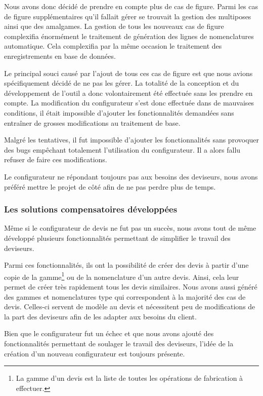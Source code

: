 Nous avons donc décidé de prendre en compte plus de cas de figure.
Parmi les cas de figure supplémentaires qu'il fallait gérer se trouvait la gestion des multiposes ainsi que des amalgames.
La gestion de tous les nouveaux cas de figure complexifia énormément le traitement de génération des lignes de nomenclatures automatique.
Cela complexifia par la même occasion le traitement des enregistrements en base de données.

Le principal souci causé par l'ajout de tous ces cas de figure est que nous avions spécifiquement décidé de ne pas les gérer.
La totalité de la conception et du développement de l'outil a donc volontairement été effectuée sans les prendre en compte.
La modification du configurateur s'est donc effectuée dans de mauvaises conditions, il était impossible d'ajouter les fonctionnalités demandées sans entraîner de grosses modifications au traitement de base.

Malgré les tentatives, il fut impossible d'ajouter les fonctionnalités sans provoquer des bugs empêchant totalement l'utilisation du configurateur.
Il a alors fallu refuser de faire ces modifications.

Le configurateur ne répondant toujours pas aux besoins des deviseurs, nous avons préféré mettre le projet de côté afin de ne pas perdre plus de temps.

\subsubsection{Les solutions compensatoires développées}

Même si le configurateur de devis ne fut pas un succès, nous avons tout de même développé plusieurs fonctionnalités permettant de simplifier le travail des deviseurs.

Parmi ces fonctionnalités, ils ont la possibilité de créer des devis à partir d'une copie de la gamme\footnote{La gamme d'un devis est la liste de toutes les opérations de fabrication à effectuer.} ou de la nomenclature d'un autre devis.
Ainsi, cela leur permet de créer très rapidement tous les devis similaires.
Nous avons aussi généré des gammes et nomenclatures type qui correspondent à la majorité des cas de devis.
Celles-ci servent de modèle au devis et nécessitent peu de modifications de la part des deviseurs afin de les adapter aux besoins du client.

Bien que le configurateur fut un échec et que nous avons ajouté des fonctionnalités permettant de soulager le travail des deviseurs, l'idée de la création d'un nouveau configurateur est toujours présente.

